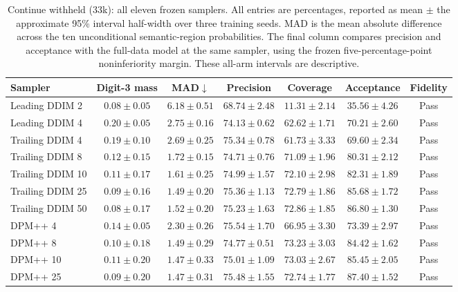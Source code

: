 \begin{table}[t]
\centering\footnotesize
\setlength{\tabcolsep}{3.5pt}
\caption{Continue withheld (33k): all eleven frozen samplers. All entries are percentages, reported as mean $\pm$ the approximate 95\% interval half-width over three training seeds. MAD is the mean absolute difference across the ten unconditional semantic-region probabilities. The final column compares precision and acceptance with the full-data model at the same sampler, using the frozen five-percentage-point noninferiority margin. These all-arm intervals are descriptive.}
\label{tab:mnist_all_continue_withheld}
\begin{tabular}{lcccccc}
\toprule
Sampler & Digit-3 mass & MAD$\downarrow$ & Precision & Coverage & Acceptance & Fidelity \\
\midrule
Leading DDIM 2 & $0.08\pm0.05$ & $6.18\pm0.51$ & $68.74\pm2.48$ & $11.31\pm2.14$ & $35.56\pm4.26$ & Pass \\
Leading DDIM 4 & $0.20\pm0.05$ & $2.75\pm0.16$ & $74.13\pm0.62$ & $62.62\pm1.71$ & $70.21\pm2.60$ & Pass \\
Trailing DDIM 4 & $0.19\pm0.10$ & $2.69\pm0.25$ & $75.34\pm0.78$ & $61.73\pm3.33$ & $69.60\pm2.34$ & Pass \\
Trailing DDIM 8 & $0.12\pm0.15$ & $1.72\pm0.15$ & $74.71\pm0.76$ & $71.09\pm1.96$ & $80.31\pm2.12$ & Pass \\
Trailing DDIM 10 & $0.11\pm0.17$ & $1.61\pm0.25$ & $74.99\pm1.57$ & $72.10\pm2.98$ & $82.31\pm1.89$ & Pass \\
Trailing DDIM 25 & $0.09\pm0.16$ & $1.49\pm0.20$ & $75.36\pm1.13$ & $72.79\pm1.86$ & $85.68\pm1.72$ & Pass \\
Trailing DDIM 50 & $0.08\pm0.17$ & $1.52\pm0.20$ & $75.23\pm1.63$ & $72.86\pm1.85$ & $86.80\pm1.30$ & Pass \\
DPM++ 4 & $0.14\pm0.05$ & $2.30\pm0.26$ & $75.54\pm1.70$ & $66.95\pm3.30$ & $73.39\pm2.97$ & Pass \\
DPM++ 8 & $0.10\pm0.18$ & $1.49\pm0.29$ & $74.77\pm0.51$ & $73.23\pm3.03$ & $84.42\pm1.62$ & Pass \\
DPM++ 10 & $0.11\pm0.20$ & $1.47\pm0.33$ & $75.01\pm1.09$ & $73.03\pm2.67$ & $85.45\pm2.05$ & Pass \\
DPM++ 25 & $0.09\pm0.20$ & $1.47\pm0.31$ & $75.48\pm1.55$ & $72.74\pm1.77$ & $87.40\pm1.52$ & Pass \\
\bottomrule
\end{tabular}
\end{table}

